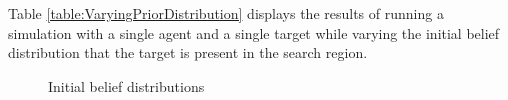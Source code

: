 Table \ref{table:VaryingPriorDistribution} displays the results of running a simulation with a single agent and a single target while varying the initial belief distribution that the target is present in the search region. 
\begin{figure}
\centering
    \qquad
    \caption{Initial belief distributions}%
    \label{fig:initialBeliefDistribution}%
\end{figure}
